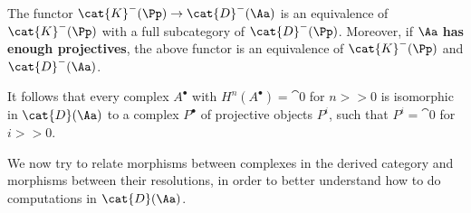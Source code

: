 \begin{thm}\label{proj-equivalence}
    The functor $\cat{K}^{-}(\Pp) \to \cat{D}^{-}(\Aa)$ is an equivalence
    of $\cat{K}^{-}(\Pp)$ with a full subcategory of $\cat{D}^{-}(\Pp)$.
    Moreover, if $\Aa$ \textbf{has enough projectives}, the above functor
    is an equivalence of $\cat{K}^{-}(\Pp)$ and $\cat{D}^{-}(\Aa)$.

    It follows that every complex $A^{\bullet}$ with 
    $H^{n}(A^{\bullet}) = \cat{0}$ for $n>>0$
    is isomorphic in $\cat{D}(\Aa)$ to a complex
    $P^{\bullet}$ of projective objects $P^{i}$,
    such that $P^{i}=\cat{0}$ for $i >> 0$.
\end{thm}


We now try to relate morphisms between complexes
in the derived category and morphisms between their resolutions,
in order to better understand how to do computations in $\cat{D}(\Aa)$.

